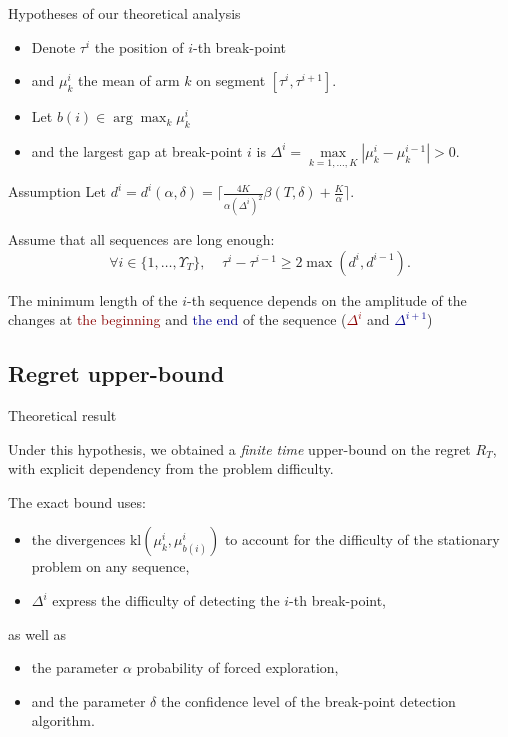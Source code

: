 \documentclass[11pt,english,ignorenonframetext,]{beamer}
\begin{document}
\begin{frame}{Hypotheses of our theoretical analysis}

  \begin{itemize}
    \item
    Denote $\tau^{i}$ the position of $i$-th break-point
    \item
    and $\mu_k^{i}$ the mean of arm $k$ on segment $[\tau^i, \tau^{i+1}]$.
    \item
    Let $b(i) \in \arg\max_k \mu_k^{i} $
    \item
    and the largest gap at break-point $i$ is
    $\Delta^{i} = \max\limits_{k=1,\dots,K} |\mu_k^{i} - \mu_k^{i-1}| >0$.
  \end{itemize}

  \pause
  \begin{block}{Assumption}
    Let $d^{i} = d^{i}(\alpha,\delta) = \lceil \frac{4K}{\alpha(\Delta^{i})^2}\beta(T,\delta) + \frac{K}{\alpha} \rceil$.

    Assume that all sequences are long enough:
    \[ \forall i \in \{1,\dots,\Upsilon_T\}, \;\;\;\; \tau^{i} - \tau^{i-1} \geq 2\max( d^{i}, d^{i-1} ). \]
  \end{block}

  The minimum length of the $i$-th sequence depends on the amplitude of the changes at \textcolor{darkred}{the beginning} and \textcolor{darkblue}{the end} of the sequence (\textcolor{darkred}{$\Delta^i$} and \textcolor{darkblue}{$\Delta^{i+1}$})

\end{frame}


\subsection{\hfill{}Regret upper-bound\hfill{}}

\begin{frame}{Theoretical result}

  Under this hypothesis, we obtained a \emph{finite time}
  upper-bound on the regret $R_T$,
  with explicit dependency from the problem difficulty.

  The exact bound uses:
  \begin{itemize}
    \item
    the divergences $\mathrm{kl}(\mu_{k}^{i},\mu_{b(i)}^{i})$ to account for the difficulty of the stationary problem on any sequence,
    \item
    $\Delta^{i}$ express the difficulty of detecting the $i$-th break-point,
  \end{itemize}
  as well as
  \begin{itemize}
    \item
    the parameter $\alpha$ probability of forced exploration,
    \item
    and the parameter $\delta$ the confidence level of the break-point detection algorithm.
  \end{itemize}

\end{frame}
\end{document}
